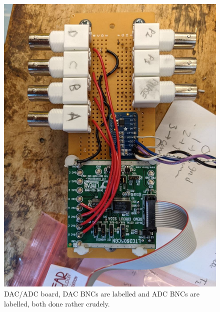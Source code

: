 \documentclass[11pt, letterpaper]{article}
\begin{document}
\begin{figure}[H]
    \centering
    \includegraphics[width=16cm]{board.jpg}
    \caption{ DAC/ADC board, DAC BNCs are labelled and ADC BNCs are labelled, both done rather crudely. }
    \label{fig:board}
\end{figure}
\end{document}
